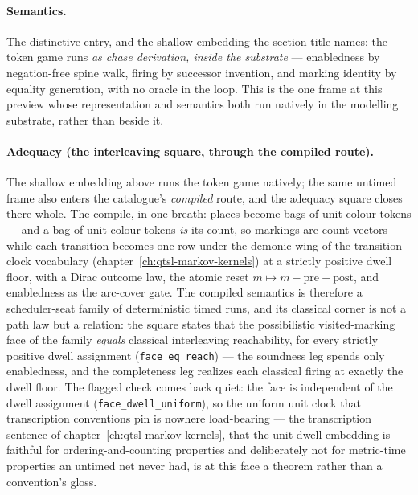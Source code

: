 \paragraph{Semantics.} The distinctive entry, and the shallow
embedding the section title names: the token game runs \emph{as chase
derivation, inside the substrate} --- enabledness by negation-free
spine walk, firing by successor invention, and marking identity by
equality generation, with no oracle in the loop. This is the one
frame at this preview whose representation and semantics both run
natively in the modelling substrate, rather than beside it.

\paragraph{Adequacy (the interleaving square, through the compiled
route).} The shallow embedding above runs the token game natively;
the same untimed frame also enters the catalogue's \emph{compiled}
route, and the adequacy square closes there whole.  The compile, in
one breath: places become bags of unit-colour tokens --- and a bag
of unit-colour tokens \emph{is} its count, so markings are count
vectors --- while each transition becomes one row under the demonic
wing of the transition-clock vocabulary
(chapter~\ref{ch:qtsl-markov-kernels}) at a strictly positive dwell
floor, with a Dirac outcome law, the atomic reset
$m \mapsto m - \mathrm{pre} + \mathrm{post}$, and enabledness as the
arc-cover gate.  The compiled semantics is therefore a
scheduler-seat family of deterministic timed runs, and its
classical corner is not a path law but a relation: the square
states that the possibilistic visited-marking face of the family
\emph{equals} classical interleaving reachability, for every
strictly positive dwell assignment (\texttt{face\_eq\_reach}) ---
the soundness leg spends only enabledness, and the completeness leg
realizes each classical firing at exactly the dwell floor.  The
flagged check comes back quiet: the face is independent of the
dwell assignment (\texttt{face\_dwell\_uniform}), so the uniform
unit clock that transcription conventions pin is nowhere
load-bearing --- the transcription sentence of
chapter~\ref{ch:qtsl-markov-kernels}, that the unit-dwell embedding
is faithful for ordering-and-counting properties and deliberately
not for metric-time properties an untimed net never had, is at this
face a theorem rather than a convention's gloss.

